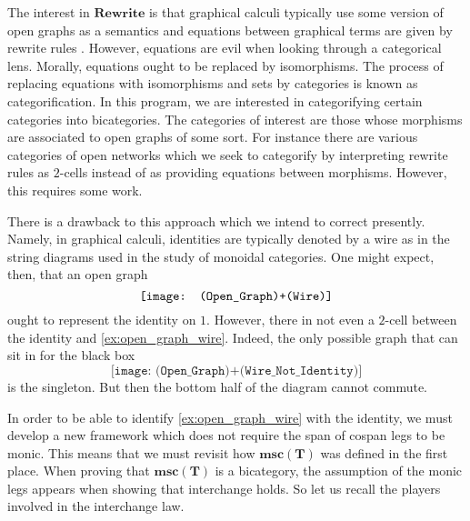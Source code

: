 \documentclass[11pt]{amsart}
\newcommand{\cat}[1]{\mathbf{#1}}
\theoremstyle{remark}
\theoremstyle{definition}
\begin{document}
The interest in $\cat{Rewrite}$ is that graphical calculi typically use some version of open graphs as a semantics and equations between graphical terms are given by rewrite rules \cite{Selinger}. However, equations are evil when looking through a categorical lens.  Morally, equations ought to be replaced by isomorphisms. The process of replacing equations with isomorphisms and sets by categories is known as categorification. In this program, we are interested in categorifying certain categories into bicategories. The categories of interest are those whose morphisms are associated to open graphs of some sort. For instance there are various categories of open networks \cite{Dixon_OpenGraphs,Fong_AlgOpenSystems,Pollard_OpenMarkov} which we seek to categorify by interpreting rewrite rules as $2$-cells instead of as providing equations between morphisms.  However, this requires some work.

There is a drawback to this approach which we intend to correct presently.  Namely, in graphical calculi, identities are typically denoted by a wire as in the string diagrams used in the study of monoidal categories.  One might expect, then, that an open graph 
\begin{equation}
\label{ex:open_graph_wire}
\raisebox{-0.75\height}{
	\texttt{[image: (Open\_Graph)+(Wire)]}
}
\end{equation}
ought to represent the identity on $1$.  However, there in not even a $2$-cell between the identity and \eqref{ex:open_graph_wire}.  Indeed, the only possible graph that can sit in for the black box
\[
	\texttt{[image: (Open\_Graph)+(Wire\_Not\_Identity)]}
\]
is the singleton. But then the bottom half of the diagram cannot commute. 

In order to be able to identify \eqref{ex:open_graph_wire} with the identity, we must develop a new framework which does not require the span of cospan legs to be monic.  This means that we must revisit how $\cat{msc}(\cat{T})$ was defined in the first place.  When proving that $\cat{msc}(\cat{T})$ is a bicategory, the assumption of the monic legs appears when showing that interchange holds.  So let us recall the players involved in the interchange law.
\end{document}
